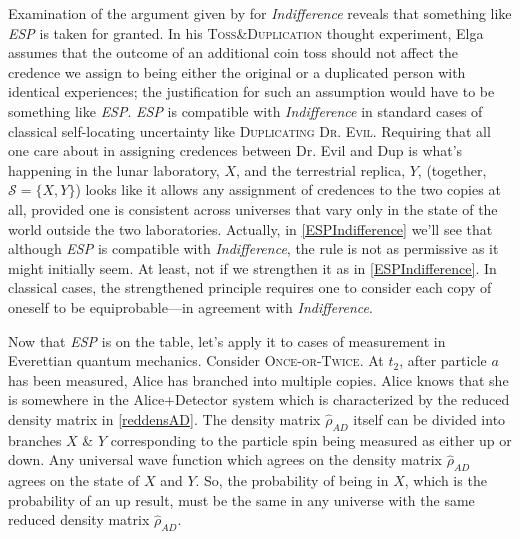 \documentclass[onecolumn,secnumarabic,amsmath,amssymb,balancelastpage,nofootinbib]{article}
\begin{document}
Examination of the argument given by \citet{elga2004} for \emph{Indifference} reveals that something like \emph{ESP} is taken for granted. In his \textsc{Toss\&Duplication} thought experiment, Elga assumes that the outcome of an additional coin toss should not affect the credence we assign to being either the original or a duplicated person with identical experiences; the justification for such an assumption would have to be something like \emph{ESP}. \emph{ESP} is compatible with \emph{Indifference} in standard cases of classical self-locating uncertainty like \textsc{Duplicating Dr. Evil}.  Requiring that all one care about in assigning credences between Dr. Evil and Dup is what's happening in the lunar laboratory, $X$, and the terrestrial replica, $Y$, (together, $\mathcal{S}=\{X,Y\}$) looks like it allows any assignment of credences to the two copies at all, provided one is consistent across universes that vary only in the state of the world outside the two laboratories.  Actually, in \textsection \ref{ESPIndifference} we'll see that although \emph{ESP} is compatible with \emph{Indifference}, the rule is not as permissive as it might initially seem.  At least, not if we strengthen it as in \textsection \ref{ESPIndifference}.  In classical cases, the strengthened principle requires one to consider each copy of oneself to be equiprobable---in agreement with \emph{Indifference}.

Now that \emph{ESP} is on the table, let's apply it to cases of measurement in Everettian quantum mechanics.  Consider \textsc{Once-or-Twice}.  At $t_2$, after particle $a$ has been measured, Alice has branched into multiple copies.  Alice knows that she is somewhere in the Alice+Detector system which is characterized by the reduced density matrix in \eqref{reddensAD}.  The density matrix $\widehat{\rho}_{AD}$ itself can be divided into branches $X$ \& $Y$ corresponding to the particle spin being measured as either up or down.  Any universal wave function which agrees on the density matrix $\widehat{\rho}_{AD}$ agrees on the state of $X$ and $Y$.  So, the probability of being in $X$, which is the probability of an up result, must be the same in any universe with the same reduced density matrix $\widehat{\rho}_{AD}$.
\end{document}
